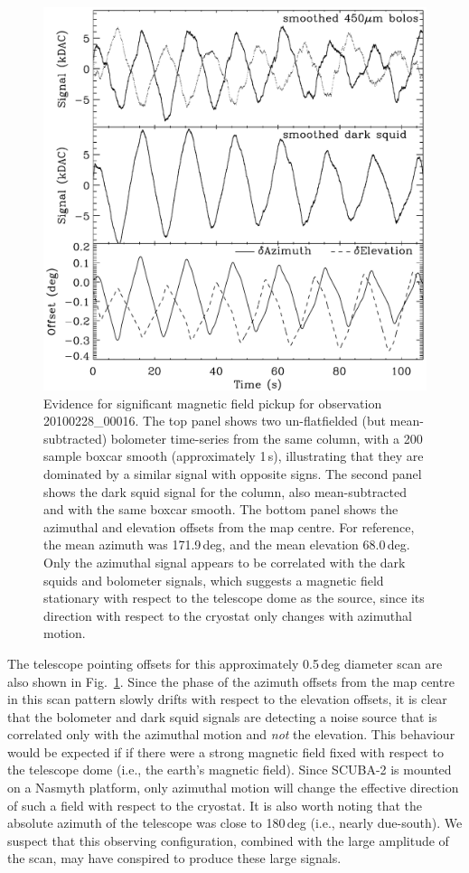 \documentclass[useAMS,usenatbib,nofootinbib]{mn2e}
\begin{document}
\begin{figure}
\centering
\includegraphics[width=\linewidth]{magpickup.pdf}
\caption{Evidence for significant magnetic field pickup for
  observation 20100228\_00016.  The top panel shows two un-flatfielded
  (but mean-subtracted) bolometer time-series from the same column,
  with a 200 sample boxcar smooth (approximately 1\,s), illustrating
  that they are dominated by a similar signal with opposite signs. The
  second panel shows the dark squid signal for the column, also
  mean-subtracted and with the same boxcar smooth. The bottom panel
  shows the azimuthal and elevation offsets from the map centre. For
  reference, the mean azimuth was 171.9\,deg, and the mean elevation
  68.0\,deg. Only the azimuthal signal appears to be correlated with
  the dark squids and bolometer signals, which suggests a magnetic
  field stationary with respect to the telescope dome as the source,
  since its direction with respect to the cryostat only changes with
  azimuthal motion.}
\label{fig:magpickup}
\end{figure}

The telescope pointing offsets for this approximately 0.5\,deg
diameter scan are also shown in Fig.~\ref{fig:magpickup}. Since the
phase of the azimuth offsets from the map centre in this scan pattern
slowly drifts with respect to the elevation offsets, it is clear that
the bolometer and dark squid signals are detecting a noise source that
is correlated only with the azimuthal motion and \emph{not} the
elevation. This behaviour would be expected if if there were a strong
magnetic field fixed with respect to the telescope dome (i.e., the
earth's magnetic field). Since SCUBA-2 is mounted on a Nasmyth
platform, only azimuthal motion will change the effective direction of
such a field with respect to the cryostat. It is also worth noting
that the absolute azimuth of the telescope was close to 180\,deg
(i.e., nearly due-south). We suspect that this observing
configuration, combined with the large amplitude of the scan, may have
conspired to produce these large signals.
\end{document}
